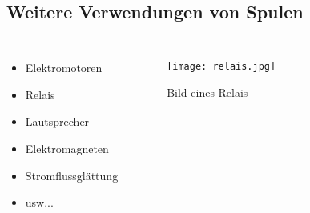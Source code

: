 \subsection{Weitere Verwendungen von Spulen}
\begin{frame}
    \makeframetitle
    \begin{columns}
        \begin{itemize}
            \item Elektromotoren
            \item Relais
            \item Lautsprecher
            \item Elektromagneten
            \item Stromflussglättung
            \item usw...
        \end{itemize}
        \begin{figure}
            \begin{center}
                \texttt{[image: relais.jpg]}
            \end{center}
            \caption{Bild eines Relais\cite{wiki_relais}}
        \end{figure}
        
    \end{columns}
\end{frame}
